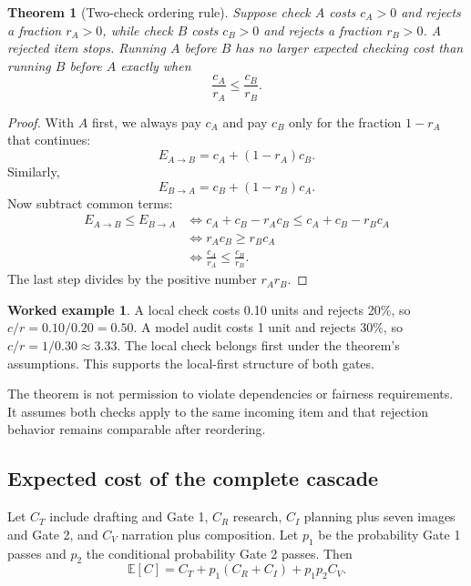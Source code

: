 \documentclass[11pt]{article}
\theoremstyle{plain}
\newtheorem{theorem}[proposition]{Theorem}
\theoremstyle{definition}
\newtheorem{workedexample}[proposition]{Worked example}
\begin{document}
\begin{theorem}[Two-check ordering rule]
\label{thm:ordering}
Suppose check $A$ costs $c_A>0$ and rejects a fraction $r_A>0$, while check $B$ costs $c_B>0$ and rejects a fraction $r_B>0$. A rejected item stops. Running $A$ before $B$ has no larger expected checking cost than running $B$ before $A$ exactly when
\begin{equation}
\frac{c_A}{r_A}\le\frac{c_B}{r_B}.
\label{eq:cost-rejection}
\end{equation}
\end{theorem}

\begin{proof}
With $A$ first, we always pay $c_A$ and pay $c_B$ only for the fraction $1-r_A$ that continues:
\[
E_{A\to B}=c_A+(1-r_A)c_B.
\]
Similarly,
\[
E_{B\to A}=c_B+(1-r_B)c_A.
\]
Now subtract common terms:
\begin{align*}
E_{A\to B}\le E_{B\to A}
&\iff c_A+c_B-r_Ac_B\le c_A+c_B-r_Bc_A\\
&\iff r_Ac_B\ge r_Bc_A\\
&\iff \frac{c_A}{r_A}\le\frac{c_B}{r_B}.
\end{align*}
The last step divides by the positive number $r_Ar_B$.
\end{proof}

\begin{workedexample}
A local check costs 0.10 units and rejects 20\%, so $c/r=0.10/0.20=0.50$. A model audit costs 1 unit and rejects 30\%, so $c/r=1/0.30\approx3.33$. The local check belongs first under the theorem's assumptions. This supports the local-first structure of both gates.
\end{workedexample}

The theorem is not permission to violate dependencies or fairness requirements. It assumes both checks apply to the same incoming item and that rejection behavior remains comparable after reordering.

\subsection{Expected cost of the complete cascade}

Let $C_T$ include drafting and Gate 1, $C_R$ research, $C_I$ planning plus seven images and Gate 2, and $C_V$ narration plus composition. Let $p_1$ be the probability Gate 1 passes and $p_2$ the conditional probability Gate 2 passes. Then
\begin{equation}
\mathbb{E}[C]=C_T+p_1(C_R+C_I)+p_1p_2C_V.
\label{eq:appendix-expected-cost}
\end{equation}
\end{document}
